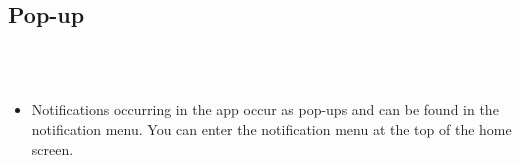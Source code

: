 \documentclass[conference]{IEEEtran}
\begin{document}
\subsection{Pop-up} \\ \\
\begin{itemize}
    \item[] Notifications occurring in the app occur as pop-ups and can be found in the notification menu. You can enter the notification menu at the top of the home screen.\\ \\ \\ \\ \\
\end{itemize}

\break
\end{document}
